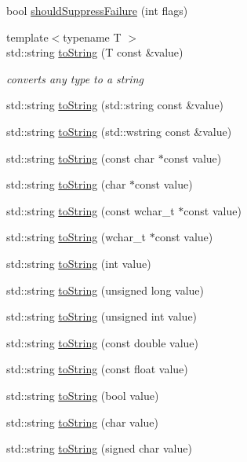 \begin{DoxyCompactItemize}
\item 
bool \hyperlink{a00117_ab91eb13081203d634fe48d3d2ab386d7}{should\+Suppress\+Failure} (int flags)
\item 
{\footnotesize template$<$typename T $>$ }\\std\+::string \hyperlink{a00117_a386cb19a84b12339486771ad143a95ae}{to\+String} (T const \&value)
\begin{DoxyCompactList}\small\item\em converts any type to a string \end{DoxyCompactList}\item 
std\+::string \hyperlink{a00117_ad6e969257437cf007b8b5017b22e570c}{to\+String} (std\+::string const \&value)
\item 
std\+::string \hyperlink{a00117_af9fc40701e3a7d0790866e7cf8c0279f}{to\+String} (std\+::wstring const \&value)
\item 
std\+::string \hyperlink{a00117_ace2e2fe33b196bc8278f605dcb72e38d}{to\+String} (const char $\ast$const value)
\item 
std\+::string \hyperlink{a00117_ae6c2bc95517444d8df8199bd3f61609b}{to\+String} (char $\ast$const value)
\item 
std\+::string \hyperlink{a00117_afa173b4639c682c9d8c20fae0939693c}{to\+String} (const wchar\+\_\+t $\ast$const value)
\item 
std\+::string \hyperlink{a00117_aa39121565abe9f30fce5d48e4e094768}{to\+String} (wchar\+\_\+t $\ast$const value)
\item 
std\+::string \hyperlink{a00117_acee54d0580385e4347bc42a7d22bc893}{to\+String} (int value)
\item 
std\+::string \hyperlink{a00117_aba1d78bce62f8c73cbfc2a14225356ea}{to\+String} (unsigned long value)
\item 
std\+::string \hyperlink{a00117_a6fd78030f740c1c3bdc60efdfd5fc85d}{to\+String} (unsigned int value)
\item 
std\+::string \hyperlink{a00117_a3eb4356d09b7ef3286f6c1c1efe8cabf}{to\+String} (const double value)
\item 
std\+::string \hyperlink{a00117_a80b6411e2cba89e58aa8feb960d045d5}{to\+String} (const float value)
\item 
std\+::string \hyperlink{a00117_a5d3bdb2ec0e6f415e2a1a0e4914d7d3a}{to\+String} (bool value)
\item 
std\+::string \hyperlink{a00117_a25a0a78cbb62ea08b5d49e443051c387}{to\+String} (char value)
\item 
std\+::string \hyperlink{a00117_a0a5d9d0965d0d2a0663773732283713e}{to\+String} (signed char value)

\end{DoxyCompactItemize}
